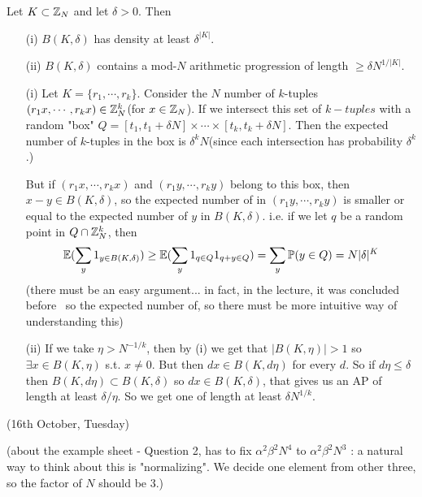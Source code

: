 \documentclass[10pt,a4paper]{report}
\newenvironment{proof}
{\begin{changemargin}{1cm}{0.5cm}
	}%
	{\end{changemargin}
}
\begin{document}
 Let $K \subset \mathbb{Z}_N$ and let $\delta >0$. Then
\begin{itemize}
\item[(i)] $B(K,\delta)$ has density at least $\delta^{|K|}$.
\item[(ii)] $B(K,\delta)$ contains a mod-$N$ arithmetic progression of length $\geq \delta N^{1/|K|}$.
\end{itemize}
\begin{proof}
\pf

\begin{itemize}
\item[(i)]Let $K = \{r_1,\cdots, r_k\}$. Consider the $N$ number of $k$-tuples $(r_1 x, \cdots, r_k x)\in \mathbb{Z}_N^k$(for $x\in \mathbb{Z}_N$). If we intersect this set of $k-tuples$ with a random "box" $Q=[t_1,t_1+\delta N] \times \cdots \times [t_k,t_k+\delta N]$. Then the expected number of $k$-tuples in the box is $\delta^k N$(since each intersection has probability $\delta^k$.)

\quad But if $(r_1 x,\cdots, r_k x)$  and $(r_1 y,\cdots, r_k y)$ belong to this box, then $x-y \in B(K,\delta)$, so the expected number of in $(r_1 y,\cdots, r_k y)$ is smaller or equal to the expected number of $y$ in $B(K,\delta)$. i.e. if we let $q$ be a random point in $Q \cap \mathbb{Z}_N^k$, then
\begin{align*}
\mathbb{E}( \sum_y 1_{y\in B(K,\delta)}) \geq \mathbb{E}(\sum_{y} 1_{q \in Q} 1_{q + y  \in Q}) = \sum_y \mathbb{P} ( y\in Q  ) = N |\delta|^{K}
\end{align*}
(there must be an easy argument... in fact, in the lecture, it was concluded before ~so the expected number of, so there must be more intuitive way of understanding this)
\item[(ii)] If we take $\eta > N^{-1/k}$, then by (i) we get that $|B(K,\eta)|>1$ so $\exists x \in B(K,\eta)$ s.t. $x\neq 0$. But then $dx \in B(K,d\eta)$ for every $d$. So if $d\eta \leq \delta$ then $B(K,d\eta) \subset B(K,\delta)$ so $dx\in B(K,\delta)$, that gives us an AP of length at least $\delta/\eta$. So we get one of length at least $\delta N^{1/k}$.
\end{itemize} 
\eop
\end{proof}
\s

\newday

(16th October, Tuesday)
\s

(about the example sheet - Question 2, has to fix $\alpha^2 \beta^2 N^4$ to $\alpha^2 \beta^2 N^3$ : a natural way to think about this is "normalizing". We decide one element from other three, so the factor of $N$ should be 3.)
\s
\end{document}
